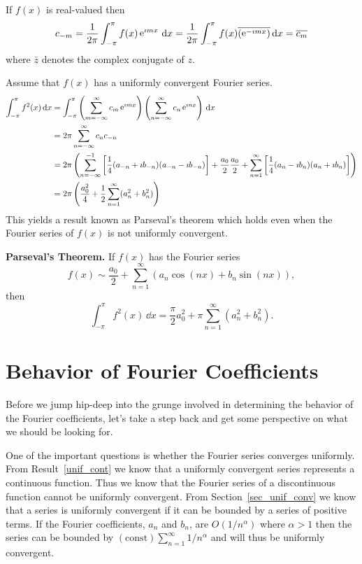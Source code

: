If $f(x)$ is real-valued then
\[ c_{-m} = \frac{1}{2\pi} \int_{-\pi}^\pi f(x) \mathop{\mathrm{e}}\nolimits^{\imath m x}\,\mathrm{d} x
= \frac{1}{2\pi} \int_{-\pi}^\pi f(x) \overline{(\mathop{\mathrm{e}}\nolimits^{-\imath m x})}\,\mathrm{d} x
= \overline{c_m} \]
where $\bar{z}$ denotes the complex conjugate of $z$.

Assume that $f(x)$ has a uniformly convergent Fourier series.
\begin{align*}
  \int_{-\pi}^\pi f^2(x)\,\mathrm{d} x
  &= \int_{-\pi}^\pi \left( \sum_{m = -\infty}^\infty c_m \mathop{\mathrm{e}}\nolimits^{\imath m x}\right)
  \left( \sum_{n = -\infty}^\infty c_n \mathop{\mathrm{e}}\nolimits^{\imath n x} \right)\,\mathrm{d} x \\
  &= 2\pi \sum_{n = -\infty}^\infty c_n c_{-n} \\
  &= 2\pi \left( \sum_{n = -\infty}^{-1} \left[ \frac{1}{4}
      (a_{-n} + \imath b_{-n})(a_{-n} - \imath b_{-n}) \right]
    + \frac{a_0}{2} \frac{a_0}{2}
    + \sum_{n=1}^\infty \left[ \frac{1}{4} (a_n - \imath b_n)
      (a_n + \imath b_n) \right] \right) \\
  &= 2 \pi \left( \frac{a_0^2}{4} + \frac{1}{2} 
    \sum_{n=1}^\infty (a_n^2 + b_n^2) \right)
\end{align*}
This yields a result known as Parseval's theorem which holds even when
the Fourier series of
$f(x)$ is not uniformly convergent.



\begin{Result}
  \textbf{Parseval's Theorem. }
  If $f(x)$ has the Fourier series
  \[ f(x) \sim \frac{a_0}{2} + \sum_{n = 1}^\infty (a_n \cos(n x) + b_n \sin(n x)),\]
  then
  \[ \int_{-\pi}^\pi f^2(x)\,\dd x = \frac{\pi}{2} a_0^2
  + \pi \sum_{n = 1}^\infty (a_n^2 + b_n^2).\]
\end{Result}








\section{Behavior of Fourier Coefficients}

Before we jump hip-deep into the grunge involved in determining the
behavior of the Fourier coefficients, let's take a step back and get
some perspective on what we should be looking for.  

One of the important questions is whether the Fourier series converges 
uniformly.  From Result~\ref{unif_cont} we know that a uniformly convergent
series represents a continuous function.  Thus we know that the Fourier
series of a discontinuous function cannot be uniformly convergent.
From Section~\ref{sec_unif_conv} we know that a series is uniformly
convergent if it can be bounded by a series of positive terms.  If the 
Fourier coefficients, $a_n$ and $b_n$, are $O(1/n^\alpha)$ where $\alpha>1$
then the series can be bounded by $(\mathrm{const}) \sum_{n=1}^\infty 1/n^\alpha$
and will thus be uniformly convergent. 









